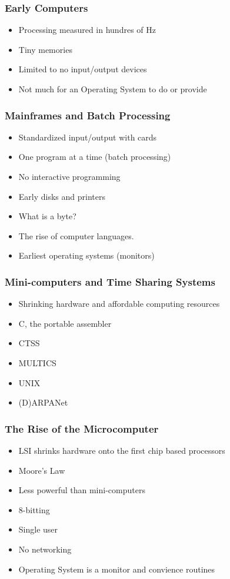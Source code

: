 \documentclass[pdftex]{beamer} %
\begin{document}
\begin{frame}
  \frametitle{Early Computers}
  \begin{itemize}
  \item Processing measured in hundres of Hz
  \item Tiny memories
  \item Limited to no input/output devices
  \item Not much for an Operating System to do or provide
  \end{itemize}
\end{frame}

\begin{frame}
  \frametitle{Mainframes and Batch Processing}
  \begin{itemize}
  \item Standardized input/output with cards
  \item One program at a time (batch processing)
  \item No interactive programming
  \item Early disks and printers
  \item What is a byte?
  \item The rise of computer languages.
  \item Earliest operating systems (monitors)
  \end{itemize}
\end{frame}

\begin{frame}
  \frametitle{Mini-computers and Time Sharing Systems}
  \begin{itemize}
  \item Shrinking hardware and affordable computing resources
  \item C, the portable assembler
  \item CTSS
  \item MULTICS
  \item UNIX
  \item (D)ARPANet
  \end{itemize}
\end{frame}

\begin{frame}
  \frametitle{The Rise of the Microcomputer}
  \begin{itemize}
  \item LSI shrinks hardware onto the first chip based processors
  \item Moore's Law
  \item Less powerful than mini-computers
  \item 8-bitting
  \item Single user
  \item No networking
  \item Operating System is a monitor and convience routines
  \end{itemize}
\end{frame}
\end{document}
